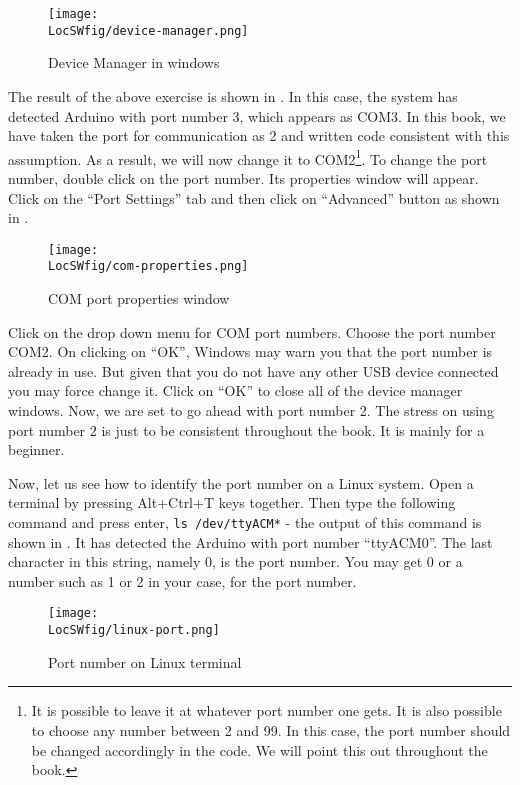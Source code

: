 \begin{figure}
      \centering
      \texttt{[image: \\LocSWfig/device-manager.png]}
      \caption{Device Manager in windows}
      \label{dev-mgr}
\end{figure}

The result of the above exercise is shown in .  In
this case, the system has detected Arduino with port number 3, which
appears as COM3.  In this book, we have taken the port for
communication as 2 and written code consistent with this assumption.    
As a result, we will now change it to
COM2\footnote{\label{fn:port}It is possible to leave it at whatever
      port number one gets.  It is also possible to choose any number
      between 2 and 99.  In this case, the port number should be
      changed accordingly in the code.  We will point this out throughout
      the book.}.  To change the port number, double click on the port
number. Its properties window will appear. Click on the ``Port
Settings'' tab and then click on ``Advanced'' button as shown in
.

\begin{figure}
      \centering
      \texttt{[image: \\LocSWfig/com-properties.png]}
      \caption{COM port properties window}
      \label{com}
\end{figure}

Click on the drop down menu for COM port numbers. Choose the port
number COM2.  On clicking on ``OK'', Windows may warn you that the port
number is already in use. But given that you do not have any other USB
device connected you may force change it. Click on ``OK'' to close
all of the device manager windows. Now, we are set to go ahead with
port number 2. The stress on using port number 2 is just to be
consistent throughout the book. It is mainly for a beginner.

Now, let us see how to identify the port number on a Linux
system. Open a terminal by pressing Alt+Ctrl+T keys together. Then
type the following command and press enter, {\tt ls
            /dev/ttyACM*} -
the output of this command is shown in . It has
detected the Arduino with port number ``ttyACM0''.  The last character
in this string, namely 0, is the port number.  You may get 0 or a
number such as 1 or 2 in your case, for the port number.

\begin{figure}
      \centering
      \texttt{[image: \\LocSWfig/linux-port.png]}
      \caption{Port number on Linux terminal}
      \label{linux-port}
\end{figure}

